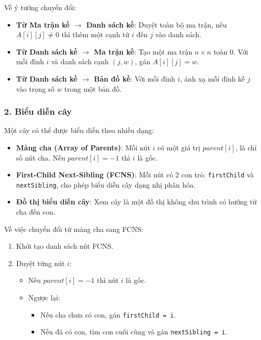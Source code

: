 \documentclass{article}
\begin{document}
	Về ý tưởng chuyển đổi:
	
	\begin{itemize}
		\item \textbf{Từ Ma trận kề $\rightarrow$ Danh sách kề}:
		Duyệt toàn bộ ma trận, nếu $A[i][j] \neq 0$ thì thêm một cạnh từ $i$ đến $j$ vào danh sách.
		\item \textbf{Từ Danh sách kề $\rightarrow$ Ma trận kề}:
		Tạo một ma trận $n \times n$ toàn 0. Với mỗi đỉnh $i$ và danh sách cạnh $(j, w)$, gán $A[i][j] = w$.
		\item \textbf{Từ Danh sách kề $\rightarrow$ Bản đồ kề}:
		Với mỗi đỉnh $i$, ánh xạ mỗi đỉnh kề $j$ vào trọng số $w$ trong một bản đồ.
	\end{itemize}
	
	\subsubsection*{2. Biểu diễn cây}
	
	Một cây có thể được biểu diễn theo nhiều dạng:
	
	\begin{itemize}
		\item \textbf{Mảng cha (Array of Parents)}: Mỗi nút $i$ có một giá trị $parent[i]$, là chỉ số nút cha. Nếu $parent[i] = -1$ thì $i$ là gốc.
		\item \textbf{First-Child Next-Sibling (FCNS)}: Mỗi nút có 2 con trỏ: \texttt{firstChild} và \texttt{nextSibling}, cho phép biểu diễn cây dạng nhị phân hóa.
		\item \textbf{Đồ thị biểu diễn cây}: Xem cây là một đồ thị không chu trình có hướng từ cha đến con.
	\end{itemize}
	
	Về việc chuyển đổi từ mảng cha sang FCNS:
	
	\begin{enumerate}
		\item Khởi tạo danh sách nút FCNS.
		\item Duyệt từng nút $i$:
		\begin{itemize}
			\item Nếu $parent[i] = -1$ thì nút $i$ là gốc.
			\item Ngược lại:
			\begin{itemize}
				\item Nếu cha chưa có con, gán \texttt{firstChild = i}.
				\item Nếu đã có con, tìm con cuối cùng và gán \texttt{nextSibling = i}.
			\end{itemize}
		\end{itemize}
	\end{enumerate}
\end{document}
